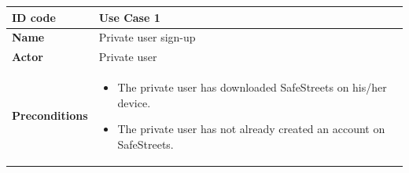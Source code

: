 \documentclass[titlepage]{article}
\begin{document}
\begin{longtable}{| p{3 cm} | p{10 cm} |} 
\hline



\textbf{ID code}   & Use Case 1\\ \hline
\textbf{Name}	& Private user sign-up \\ \hline
\textbf{Actor}     & Private user	 \\ \hline
\textbf{Preconditions} & 
\begin{itemize}
	\item The private user has downloaded SafeStreets on his/her device. 
	\item The private user has not already created an account on SafeStreets.
\end{itemize} 
     \\ \hline
     

\end{longtable}
\end{document}
